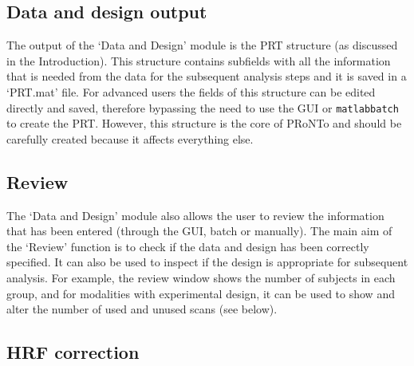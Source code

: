 \subsection{Data and design output}

The output of the `Data and Design' module is the PRT structure (as discussed in the Introduction). This structure contains subfields with all the information that is needed from the data for the subsequent analysis steps and it is saved in a `PRT.mat' file. For advanced users the fields of this structure can be edited directly and saved, therefore bypassing the need to use the GUI or  {\tt matlabbatch} to create the PRT. However, this structure is the core of PRoNTo and should be carefully created because it affects everything else.

\subsection{Review}

The `Data and Design' module also allows the user to review the information that has been entered (through the GUI, batch or manually). The main aim of the `Review' function is to check if the data and design has been correctly specified. It can also be used to inspect if the design is appropriate for subsequent analysis. For example, the review window shows the number of subjects in each group, and for modalities with experimental design, it can be used to show and alter the number of used and unused scans (see below). 

\subsection{HRF correction}

